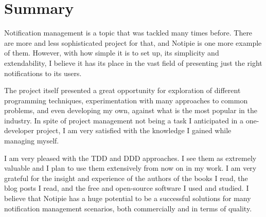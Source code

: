 \section{Summary}\label{sec:summary}

Notification management is a topic
that was tackled many times before.
There are more and less sophisticated
project for that,
and Notipie is one more example of them.
However,
with how simple it is to set up,
its simplicity and extendability,
I believe it has its place
in the vast field of
presenting just the right notifications
to its users.

The project itself presented a great opportunity
for exploration of different programming techniques,
experimentation with many approaches to common problems,
and even developing my own,
against what is the most popular in the industry.
In spite of project management
not being a task I anticipated
in a one-developer project,
I am very satisfied with the knowledge
I gained while managing myself.

I am very pleased with the \ac{TDD} and \ac{DDD} approaches.
I see them as extremely valuable
and I plan to use them extensively
from now on in my work.
I am very grateful for the insight
and experience of the authors of the books I read,
the blog posts I read,
and the free and open-source software
I used and studied.
I believe that Notipie has a huge potential
to be a successful solutions for many
notification management scenarios,
both commercially
and in terms of quality.
